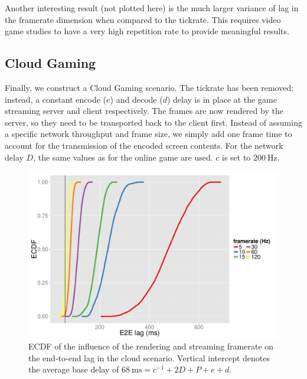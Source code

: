 Another interesting result (not plotted here) is the much larger variance of lag in the framerate dimension when compared to the tickrate. This requires video game studies to have a very high repetition rate to provide meaningful results.


\subsection{Cloud Gaming}

Finally, we construct a Cloud Gaming scenario. The tickrate has been removed;  instead, a constant encode ($e$) and decode ($d$) delay is in place at the game streaming server and client respectively. The frames are now rendered by the server, so they need to be transported back to the client first. Instead of assuming a specific network throughput and frame size, we simply add one frame time to account for the transmission of the encoded screen contents.
For the network delay $D$, the same values as for the online game are used. $c$ is set to $\SI{200}{\hertz}$.

\begin{figure}[!t]
	\centering
	\includegraphics[width=1.0\columnwidth]{../../simulation/visualization/cloudgaming-lag-cdf.pdf}
	\caption{\acrshort{ECDF} of the influence of the rendering and streaming framerate on the end-to-end lag in the cloud scenario. Vertical intercept denotes the average base delay of $\SI{68}{\milli\second}=c^{-1}+2D+P+e+d$.}
\label{fig:cloud-e2e-delay-sim}
\end{figure}

